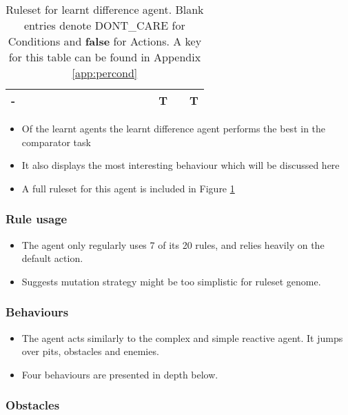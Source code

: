 \begin{table}[!t]
\begin{adjustwidth}{-2cm}{-2cm}
\begin{center}
\begin{tabular}{ | c | c | c | c | c | c | c | c | c | c | c | c || c | c | c | c |}
	-  & & & & & & & & & & & 		& & T & & T \\ \hline
    \end{tabular}
  \end{center}
  \end{adjustwidth}
  \caption{Ruleset for learnt difference agent. Blank entries denote {\scriptsize DONT\_CARE} for Conditions and \textbf{false} for Actions. A key for this table can be found in Appendix \ref{app:percond}}
  \label{tab:LDA}
\end{table}

\begin{itemize}
\item Of the learnt agents the learnt difference agent performs the best in the comparator task
\item It also displays the most interesting behaviour which will be discussed here
\item A full ruleset for this agent is included in Figure \ref{tab:LDA} 
\end{itemize}

\subsubsection{Rule usage}

\begin{itemize}
\item The agent only regularly uses 7 of its 20 rules, and relies heavily on the default action.
\item Suggests mutation strategy might be too simplistic for ruleset genome.
\end{itemize}

\subsubsection{Behaviours}

\begin{itemize}
\item The agent acts similarly to the complex and simple reactive agent. It jumps over pits, obstacles and enemies.
\item Four behaviours are presented in depth below. 
\end{itemize}

\subsubsection*{\hspace{6pt}Obstacles}

